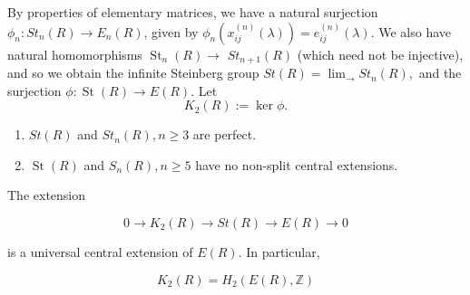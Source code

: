 By properties of elementary matrices, we have a natural surjection $\phi_n: S t_n(R) \rightarrow E_n(R)$, given by $\phi_n\left(x_{i j}^{(n)}(\lambda)\right)=e_{i j}^{(n)}(\lambda)$. We also have natural homomorphisms $\operatorname{St}_n(R) \rightarrow$ $S t_{n+1}(R)$ (which need not be injective), and so we obtain the infinite Steinberg group
$
S t(R)=\lim _{\rightarrow} S t_n(R),
$
and the surjection $\phi: \operatorname{St}(R) \longrightarrow E(R)$. Let $$K_2(R):=\ker \phi.$$

 \begin{prop}
    \begin{enumerate}
        \item $S t(R)$ and $S t_n(R), n \geq 3$ are perfect.
\item $\operatorname{St}(R)$ and $S_n(R), n \geq 5$ have no non-split central extensions.
    \end{enumerate}
\end{prop}
\begin{coro}
    The extension

    $$
    0 \longrightarrow K_2(R) \longrightarrow S t(R) \longrightarrow E(R) \longrightarrow 0
    $$
    
    is a universal central extension of $E(R)$. In particular,
    
    $$
    K_2(R)=H_2(E(R), \mathbb{Z})
    $$   
\end{coro}
 







